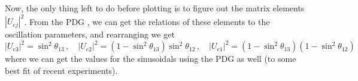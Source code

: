 \documentclass[10pt]{article}
\begin{document}
Now, the only thing left to do before plotting is to figure out the matrix elements $|U_{ej}|^{2}$. From the PDG \cite{pdg_true}, we can get the relations of these elements to the oscillation parameters, and rearranging we get
\begin{equation}
  |U_{e3}|^{2} = \sin^{2}\theta_{13}\, , \quad |U_{e2}|^{2} = (1-\sin^{2}\theta_{13})\sin^{2}\theta_{12}\, , \quad |U_{e1}|^{2} = (1-\sin^{2}\theta_{13})(1 - \sin^{2}\theta_{12})
\end{equation}
where we can get the values for the sinusoidals using the PDG \cite{pdg_true} as well (to some best fit of recent experiments).

  


\newpage
%



\end{document}
